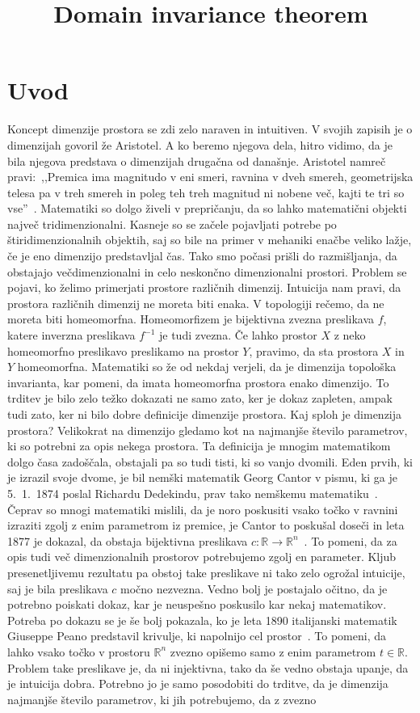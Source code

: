\documentclass[mat1]{fmfdelo}
\title{Domain invariance theorem}
\newcommand{\R}{\mathbb R}
\newcommand{\0}{\underline{0}}
\def\citat#1{,,#1''}
\begin{document}
\section{Uvod}
Koncept dimenzije prostora se zdi zelo naraven in intuitiven. V svojih zapisih je o dimenzijah govoril že Aristotel. A ko beremo njegova dela, hitro vidimo, da je bila njegova predstava o dimenzijah drugačna od današnje. Aristotel namreč pravi:~\citat{Premica ima magnitudo v eni smeri, ravnina v dveh smereh, geometrijska telesa pa v treh smereh in poleg teh treh magnitud ni nobene več, kajti te tri so vse}~\cite[str.\ 1, moj prevod]{4dim}. Matematiki so dolgo živeli v prepričanju, da so lahko matematični objekti največ tridimenzionalni. Kasneje so se začele pojavljati potrebe po štiridimenzionalnih objektih, saj so bile na primer v mehaniki enačbe veliko lažje, če je eno dimenzijo predstavljal čas. Tako smo počasi prišli do razmišljanja, da obstajajo večdimenzionalni in celo neskončno dimenzionalni prostori. Problem se pojavi, ko želimo primerjati prostore različnih dimenzij. Intuicija nam pravi, da prostora različnih dimenzij ne moreta biti enaka. V topologiji rečemo, da ne moreta biti homeomorfna. Homeomorfizem je bijektivna zvezna preslikava $f$, katere inverzna preslikava $f^{-1}$ je tudi zvezna. Če lahko prostor $X$ z neko homeomorfno preslikavo preslikamo na prostor $Y$, pravimo, da sta prostora $X$ in $Y$ homeomorfna. Matematiki so že od nekdaj verjeli, da je dimenzija topološka invarianta, kar pomeni, da imata homeomorfna prostora enako dimenzijo. To trditev je bilo zelo težko dokazati ne samo zato, ker je dokaz zapleten, ampak tudi zato, ker ni bilo dobre definicije dimenzije prostora. Kaj sploh je dimenzija prostora? Velikokrat na dimenzijo gledamo kot na najmanjše število parametrov, ki so potrebni za opis nekega prostora. Ta definicija je mnogim matematikom dolgo časa zadoščala, obstajali pa so tudi tisti, ki so vanjo dvomili. Eden prvih, ki je izrazil svoje dvome, je bil nemški matematik Georg Cantor v pismu, ki ga je 5.\ 1.\ 1874 poslal Richardu Dedekindu, prav tako nemškemu matematiku~\cite[str.\ 201]{Gouvea2011}. Čeprav so mnogi matematiki mislili, da je noro poskusiti vsako točko v ravnini izraziti zgolj z enim parametrom iz premice, je Cantor to poskušal doseči in leta 1877 je dokazal, da obstaja bijektivna preslikava $c : \R \to \R^n$~\cite[str.\ 203]{Gouvea2011}. To pomeni, da za opis tudi več dimenzionalnih prostorov potrebujemo zgolj en parameter. Kljub presenetljivemu rezultatu pa obstoj take preslikave ni tako zelo ogrožal intuicije, saj je bila preslikava $c$ močno nezvezna. Vedno bolj je postajalo očitno, da je potrebno poiskati dokaz, kar je neuspešno poskusilo kar nekaj matematikov. Potreba po dokazu se je še bolj pokazala, ko je leta 1890 italijanski matematik Giuseppe Peano predstavil krivulje, ki napolnijo cel prostor~\cite{Peano}. To pomeni, da lahko vsako točko v prostoru $\R^n$ zvezno opišemo samo z enim parametrom $t \in \R$. Problem take preslikave je, da ni injektivna, tako da še vedno obstaja upanje, da je intuicija dobra. Potrebno jo je samo posodobiti do trditve, da je dimenzija najmanjše število parametrov, ki jih potrebujemo, da z zvezno 
\end{document}
